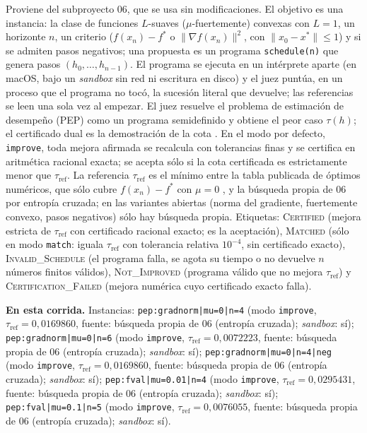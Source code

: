 \documentclass[11pt,a4paper]{article}
\begin{document}
Proviene del subproyecto 06, que se usa sin modificaciones. El objetivo es una instancia: la clase de funciones $L$-suaves ($\mu$-fuertemente) convexas con $L = 1$, un horizonte $n$, un criterio ($f(x_n) - f^*$ o $\|\nabla f(x_n)\|^2$, con $\|x_0 - x^*\| \le 1$) y si se admiten pasos negativos; una propuesta es un programa \texttt{schedule(n)} que genera pasos $(h_0,\dots,h_{n-1})$. El programa se ejecuta en un intérprete aparte (en macOS, bajo un \emph{sandbox} sin red ni escritura en disco) y el juez puntúa, en un proceso que el programa no tocó, la sucesión literal que devuelve; las referencias se leen una sola vez al empezar. El juez resuelve el problema de estimación de desempeño (PEP) como un programa semidefinido y obtiene el peor caso $\tau(h)$; el certificado dual es la demostración de la cota \citep{DroriTeboulle2014,TaylorHendrickxGlineur2017}. En el modo por defecto, \texttt{improve}, toda mejora afirmada se recalcula con tolerancias finas y se certifica en aritmética racional exacta; se acepta sólo si la cota certificada es estrictamente menor que $\tau_{\mathrm{ref}}$. La referencia $\tau_{\mathrm{ref}}$ es el mínimo entre la tabla publicada de óptimos numéricos, que sólo cubre $f(x_n) - f^*$ con $\mu = 0$ \citep{DasGuptaVanParysRyu2024,GrimmerShuWang2024}, y la búsqueda propia de 06 por entropía cruzada; en las variantes abiertas (norma del gradiente, fuertemente convexo, pasos negativos) sólo hay búsqueda propia. Etiquetas: \textsc{Certified} (mejora estricta de $\tau_{\mathrm{ref}}$ con certificado racional exacto; es la aceptación), \textsc{Matched} (sólo en modo \texttt{match}: iguala $\tau_{\mathrm{ref}}$ con tolerancia relativa $10^{-4}$, sin certificado exacto), \textsc{Invalid\_Schedule} (el programa falla, se agota su tiempo o no devuelve $n$ números finitos válidos), \textsc{Not\_Improved} (programa válido que no mejora $\tau_{\mathrm{ref}}$) y \textsc{Certification\_Failed} (mejora numérica cuyo certificado exacto falla).

\textbf{En esta corrida.} Instancias: \texttt{pep:\allowbreak{}gradnorm|\allowbreak{}mu=\allowbreak{}0|\allowbreak{}n=\allowbreak{}4} (modo \texttt{improve}, $\tau_{\mathrm{ref}} = 0{,}0169860$, fuente: búsqueda propia de 06 (entropía cruzada); \emph{sandbox}: sí); \texttt{pep:\allowbreak{}gradnorm|\allowbreak{}mu=\allowbreak{}0|\allowbreak{}n=\allowbreak{}6} (modo \texttt{improve}, $\tau_{\mathrm{ref}} = 0{,}0072223$, fuente: búsqueda propia de 06 (entropía cruzada); \emph{sandbox}: sí); \texttt{pep:\allowbreak{}gradnorm|\allowbreak{}mu=\allowbreak{}0|\allowbreak{}n=\allowbreak{}4|\allowbreak{}neg} (modo \texttt{improve}, $\tau_{\mathrm{ref}} = 0{,}0169860$, fuente: búsqueda propia de 06 (entropía cruzada); \emph{sandbox}: sí); \texttt{pep:\allowbreak{}fval|\allowbreak{}mu=\allowbreak{}0.01|\allowbreak{}n=\allowbreak{}4} (modo \texttt{improve}, $\tau_{\mathrm{ref}} = 0{,}0295431$, fuente: búsqueda propia de 06 (entropía cruzada); \emph{sandbox}: sí); \texttt{pep:\allowbreak{}fval|\allowbreak{}mu=\allowbreak{}0.1|\allowbreak{}n=\allowbreak{}5} (modo \texttt{improve}, $\tau_{\mathrm{ref}} = 0{,}0076055$, fuente: búsqueda propia de 06 (entropía cruzada); \emph{sandbox}: sí).
\end{document}

